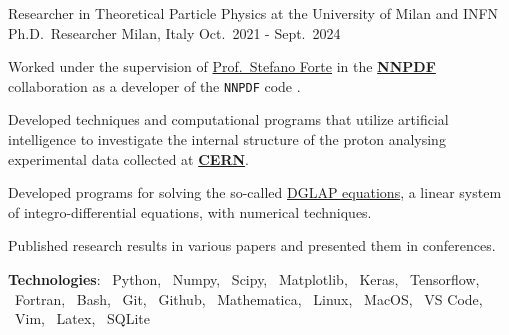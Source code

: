 

\begin{cventries}

  \cventry
  {Researcher in Theoretical Particle Physics at the University of Milan and INFN}
  {Ph.D.\ Researcher}
  {Milan, Italy}
  {Oct.\ 2021 - Sept.\ 2024}
  {
      \begin{cvitems} %
          \item Worked under the supervision of \href{https://inspirehep.net/authors/1009661?ui-citation-summary=true}{Prof.\ Stefano Forte} in the \href{https://nnpdf.mi.infn.it}{\textbf{NNPDF}} collaboration 
          as a developer of the \texttt{NNPDF} code \href{https://github.com/NNPDF}{\githublogo}.
          \item Developed techniques and computational programs that utilize artificial intelligence to 
          investigate the internal structure of the proton analysing experimental data collected at \href{https://home.cern}{\textbf{CERN}}.
          \item Developed programs for solving the so-called \href{https://en.wikipedia.org/wiki/DGLAP_evolution_equations}{DGLAP equations}, a linear system of integro-differential equations, with numerical techniques.
          \item Published research results in various papers and presented them in conferences.
          \item[] \textbf{\textcolor{awesome-red}{Tec}hnologies}: \pythonlogo{}~Python, \numpylogo{}~Numpy, \scipylogo{}~Scipy, \matplotliblogo{}~Matplotlib{}, \keraslogo{}~Keras, \tensorflowlogo{}~Tensorflow, \fortranlogo{}~Fortran, \bashlogo{}~Bash, \gitlogo{}~Git, \githublogo{}~Github, \mathematicalogo{}~Mathematica, \linuxlogo{}~Linux, \faApple{}~MacOS, \vscodelogo{}~VS Code, \vimlogo{}~Vim, \latexlogo{}~Latex, \sqlitelogo{}~SQLite
      \end{cvitems}
      }


\end{cventries}
